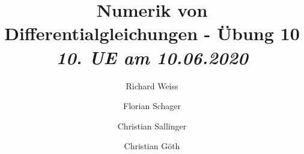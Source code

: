 \documentclass{article}
\title
{
  Numerik von Differentialgleichungen - Übung 10 \\
  \vspace{4pt}
  \normalsize
  \textit{10. UE am 10.06.2020}
}
\author
{
  Richard Weiss       \and
  Florian Schager     \and
  Christian Sallinger \and
  Christian Göth
}
\date{}
\begin{document}
\renewcommand{\figurename}{Abbildung}
\maketitle






\end{document}
